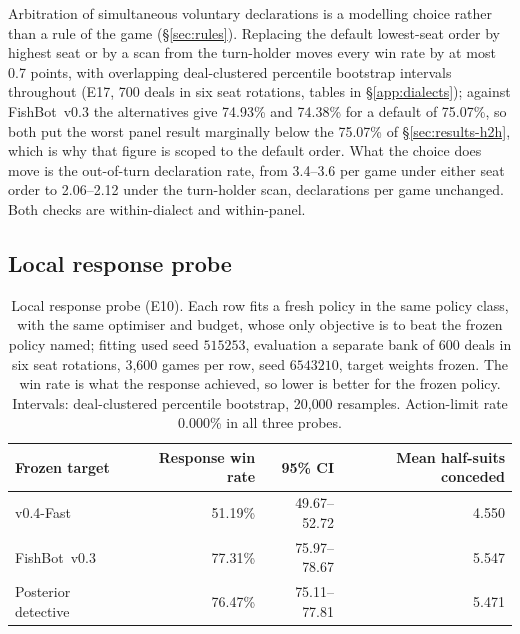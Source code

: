 \documentclass[11pt]{article}
\theoremstyle{definition}
\DeclareRobustCommand{\vfast}{\texorpdfstring{\mbox{v0.4-Fast}}{v0.4-Fast}}
\DeclareRobustCommand{\vthree}{\texorpdfstring{\mbox{FishBot v0.3}}{FishBot v0.3}}
\newcommand{\numWorstCase}{75.07}
\newcommand{\numVsVthree}{75.07}
\newcommand{\numLBRGames}{3{,}600}
\newcommand{\numLBRLimit}{0.000\%}
\newcommand{\numBootstrapDraws}{20{,}000}
\newcommand{\numLBRDeals}{600}
\newcommand{\numEseventeenDeals}{700}
\newcommand{\numArbHighVthree}{74.93}
\newcommand{\numArbTurnVthree}{74.38}
\newcommand{\numArbMaxMove}{0.7}
\newcommand{\numArbOOTSeatLo}{3.4}
\newcommand{\numArbOOTSeatHi}{3.6}
\newcommand{\numArbOOTTurnLo}{2.06}
\newcommand{\numArbOOTTurnHi}{2.12}
\begin{document}
Arbitration of simultaneous voluntary declarations is a modelling choice rather
than a rule of the game (\S\ref{sec:rules}). Replacing the default lowest-seat
order by highest seat or by a scan from the turn-holder moves every win rate by
at most \numArbMaxMove{} points, with overlapping deal-clustered percentile
bootstrap intervals throughout (E17, \numEseventeenDeals{} deals in six seat
rotations, tables in \S\ref{app:dialects}); against \vthree{} the alternatives
give \numArbHighVthree\% and \numArbTurnVthree\% for a default of \numVsVthree\%,
so both put the worst panel result marginally below the \numWorstCase\% of
\S\ref{sec:results-h2h}, which is why that figure is scoped to the default order.
What the choice does move is the out-of-turn declaration rate, from
\numArbOOTSeatLo--\numArbOOTSeatHi{} per game under either seat order to
\numArbOOTTurnLo--\numArbOOTTurnHi{} under the turn-holder scan, declarations per
game unchanged. Both checks are within-dialect and within-panel.

\subsection{Local response probe}
\label{sec:lbr}

\begin{table}[!htbp]
\centering
\caption{Local response probe (E10). Each row fits a fresh policy in the same
policy class, with the same optimiser and budget, whose only objective is to beat
the frozen policy named; fitting used seed $515253$, evaluation a separate bank
of \numLBRDeals{} deals in six seat rotations, \numLBRGames{} games per row, seed
$6543210$, target weights frozen. The win rate is what the response achieved, so
lower is better for the frozen policy. Intervals: deal-clustered percentile
bootstrap, \numBootstrapDraws{} resamples. Action-limit rate \numLBRLimit{} in
all three probes.}
\label{tab:lbr}
\small
\begin{tabular}{lrrr}
\toprule
Frozen target & Response win rate & 95\% CI & Mean half-suits conceded \\
\midrule
\vfast{} & 51.19\% & 49.67--52.72 & 4.550 \\
\vthree{} & 77.31\% & 75.97--78.67 & 5.547 \\
Posterior detective & 76.47\% & 75.11--77.81 & 5.471 \\
\bottomrule
\end{tabular}%
\end{table}
\end{document}
